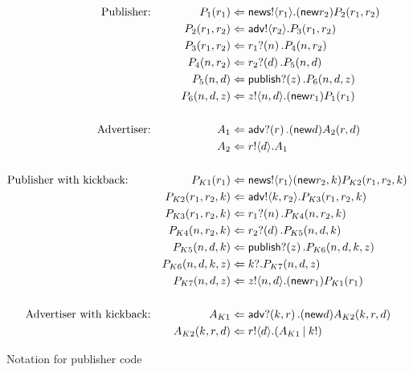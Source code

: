 \documentclass{LMCS}
\newcommand{\pfn}[1]{\mathsf{#1}}  \newcommand{\cfn}[1]{\mathsf{#1}}  \newcommand{\ownfnt}[1]{{\mathsf{#1}}}
\newcommand{\pa}[1]{\!\left(#1\right)}
\newcommand{\pc}[1]{\langle#1\rangle}
\newcommand{\CnewNT}[1]{(\pfn{new} {#1})}
\newcommand{\Cpar}{\mathbin{|}}
\begin{document}
\begin{figure}[t]

  \begin{alignat*}{2}
\text{Publisher:}& &\qquad
P_1(r_1)  &\Leftarrow   \news!\pc{r_1}. \CnewNT{r_2} P_2(r_1,r_2)\\
& & P_2(r_1,r_2) &\Leftarrow \adv!\pc{r_2}. P_3(r_1,r_2) \\
& & P_3(r_1,r_2)   &\Leftarrow  r_1?\pa{n}. P_4(n,r_2)\\
& & P_4(n,r_2)   &\Leftarrow   r_2?\pa{d}. P_5(n,d) \\
& & P_5(n,d)     &\Leftarrow  \publish?\pa{z}. P_6(n,d,z)\\
& & P_6(n,d,z)   &\Leftarrow    z!\pc{n,d}. \CnewNT{r_1} P_1(r_1)\\
\\
\text{Advertiser:}& &\qquad
A_1      &\Leftarrow   \adv?\pa{r}. \CnewNT{d} A_{2}(r,d)  \\
& & A_2      &\Leftarrow   r!\pc{d}.A_1 
\\
\\
\text{Publisher with kickback:}\qquad &  &
P_{K1}(r_1)  &\Leftarrow   \news!\pc{r_1} \CnewNT{r_2,k} P_{K2}(r_1,r_2,k)\\
& & P_{K2}(r_1,r_2,k) &\Leftarrow \adv!\pc{k,r_2}. P_{K3}(r_1,r_2,k) \\
& & P_{K3}(r_1,r_2,k)   &\Leftarrow  r_1?\pa{n}. P_{K4}(n,r_2,k)\\
& & P_{K4}(n,r_2,k)   &\Leftarrow   r_2?\pa{d}. P_{K5}(n,d,k) \\
& & P_{K5}(n,d,k)     &\Leftarrow  \publish?\pa{z}. P_{K6}(n,d,k,z)\\
& & P_{K6}(n,d,k,z)   &\Leftarrow    k?. P_{K7}(n,d,z)\\
& & P_{K7}(n,d,z)   &\Leftarrow    z!\pc{n,d}. \CnewNT{r_1} P_{K1}(r_1)\\
\\
\text{Advertiser with kickback:} & & \qquad
A_{K1}      &\Leftarrow   \adv?\pa{k,r}. \CnewNT{d} A_{K2}(k,r,d)  \\
& & A_{K2}(k,r,d)      &\Leftarrow   r!\pc{d}.(A_{K1} \Cpar k!)\\
\end{alignat*}


  \caption{Notation for publisher code}
  \label{fig:pubcode}
\end{figure}
\end{document}
